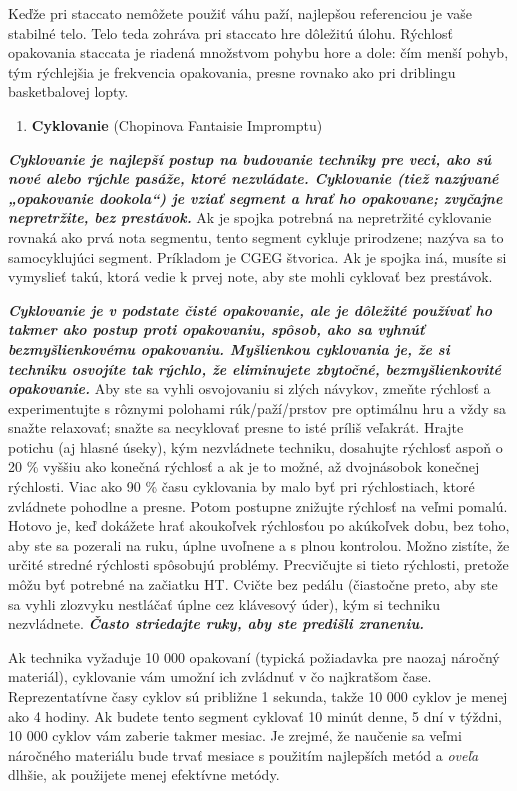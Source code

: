 \documentclass[11pt,a4paper%
]{book}
\begin{document}
Keďže pri staccato nemôžete použiť váhu paží, najlepšou referenciou je vaše stabilné telo. Telo teda zohráva pri staccato hre dôležitú úlohu. Rýchlosť opakovania staccata je riadená množstvom pohybu hore a dole: čím menší pohyb, tým rýchlejšia je frekvencia opakovania, presne rovnako ako pri driblingu basketbalovej lopty.

\begin{enumerate}
\def\labelenumi{\arabic{enumi}.}
\setcounter{enumi}{1}
\item
  \textbf{Cyklovanie} (Chopinova Fantaisie Impromptu)
\end{enumerate}

\emph{\textbf{Cyklovanie je najlepší postup na budovanie techniky pre veci, ako sú nové alebo rýchle pasáže, ktoré nezvládate. Cyklovanie (tiež nazývané „opakovanie dookola``) je vziať segment a hrať ho opakovane; zvyčajne nepretržite, bez prestávok.}} Ak je spojka potrebná na nepretržité cyklovanie rovnaká ako prvá nota segmentu, tento segment cykluje prirodzene; nazýva sa to samocyklujúci segment. Príkladom je CGEG štvorica. Ak je spojka iná, musíte si vymyslieť takú, ktorá vedie k prvej note, aby ste mohli cyklovať bez prestávok.

\emph{\textbf{Cyklovanie je v podstate čisté opakovanie, ale je dôležité používať ho takmer ako postup proti opakovaniu, spôsob, ako sa vyhnúť bezmyšlienkovému opakovaniu. Myšlienkou cyklovania je, že si techniku osvojíte tak rýchlo, že eliminujete zbytočné, bezmyšlienkovité opakovanie.}} Aby ste sa vyhli osvojovaniu si zlých návykov, zmeňte rýchlosť a experimentujte s rôznymi polohami rúk/paží/prstov pre optimálnu hru a vždy sa snažte relaxovať; snažte sa necyklovať presne to isté príliš veľakrát. Hrajte potichu (aj hlasné úseky), kým nezvládnete techniku, dosahujte rýchlosť aspoň o 20 \% vyššiu ako konečná rýchlosť a ak je to možné, až dvojnásobok konečnej rýchlosti. Viac ako 90 \% času cyklovania by malo byť pri rýchlostiach, ktoré zvládnete pohodlne a presne. Potom postupne znižujte rýchlosť na veľmi pomalú. Hotovo je, keď dokážete hrať akoukoľvek rýchlosťou po akúkoľvek dobu, bez toho, aby ste sa pozerali na ruku, úplne uvoľnene a s plnou kontrolou. Možno zistíte, že určité stredné rýchlosti spôsobujú problémy. Precvičujte si tieto rýchlosti, pretože môžu byť potrebné na začiatku HT. Cvičte bez pedálu (čiastočne preto, aby ste sa vyhli zlozvyku nestláčať úplne cez klávesový úder), kým si techniku nezvládnete. \emph{\textbf{Často striedajte ruky, aby ste predišli zraneniu.}}

Ak technika vyžaduje 10 000 opakovaní (typická požiadavka pre naozaj náročný materiál), cyklovanie vám umožní ich zvládnuť v čo najkratšom čase. Reprezentatívne časy cyklov sú približne 1 sekunda, takže 10 000 cyklov je menej ako 4 hodiny. Ak budete tento segment cyklovať 10 minút denne, 5 dní v týždni, 10 000 cyklov vám zaberie takmer mesiac. Je zrejmé, že naučenie sa veľmi náročného materiálu bude trvať mesiace s použitím najlepších metód a \emph{oveľa} dlhšie, ak použijete menej efektívne metódy.
\end{document}
